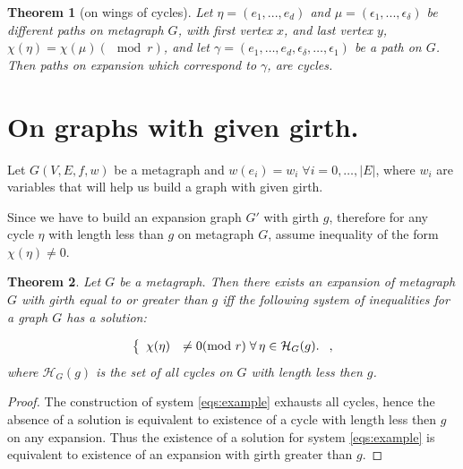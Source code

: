 \documentclass[a4paper,fleqn]{cas-sc}
\newtheorem{theorem}{Theorem}
\begin{document}
\begin{theorem}[on wings of cycles]\label{theorem_wings}
    Let $\eta = (e_1, ..., e_d)$ and $\mu = (\epsilon_1, ..., \epsilon_{\delta})$ be different paths on metagraph $G$, with first vertex $x$, and last vertex $y$, $\chi(\eta) = \chi(\mu) (\mod{r})$, and let $\gamma = (e_1, \dots, e_d, \epsilon_{\delta}, \dots, \epsilon_1)$ be a path on $G$. Then paths on expansion which correspond to $\gamma$, are cycles.
\end{theorem}

\section{On graphs with given girth.}


Let $G(V, E, f, w)$ be a metagraph and $w(e_i) = w_i \; \forall i = 0, \dots, |E|$, where $w_i$ are variables that will help us build a graph with given girth.


Since we have to build an expansion graph $G'$ with girth $g$, therefore for any cycle $\eta$ with length less than $g$ on metagraph $G$, assume inequality of the form $\chi(\eta) \neq 0$.

\begin{theorem}

Let $G$ be a metagraph. Then there exists an expansion of metagraph $G$ with girth equal to or greater than $g$ iff the following system of inequalities for a graph $G$ has a solution:

\begin{equation}
    \centering
    \left\{
        \begin{array}{ll}
            \chi(\eta) &\neq 0 (\mod{r}) \; \forall \, \eta \in \mathcal{H}_G(g).
        \end{array}
    \right.,
    \label{eqs:example}
\end{equation}
where $\mathcal{H}_G(g)$ is the set of all cycles on $G$ with length less then $g$.

\end{theorem}

\begin{proof}
    The construction of system \eqref{eqs:example} exhausts all cycles, hence the absence of a solution is equivalent to existence of a cycle with length less then $g$ on any expansion. Thus the existence of a solution for system \eqref{eqs:example} is equivalent to existence of an expansion with girth greater than $g$.
\end{proof}
\end{document}
